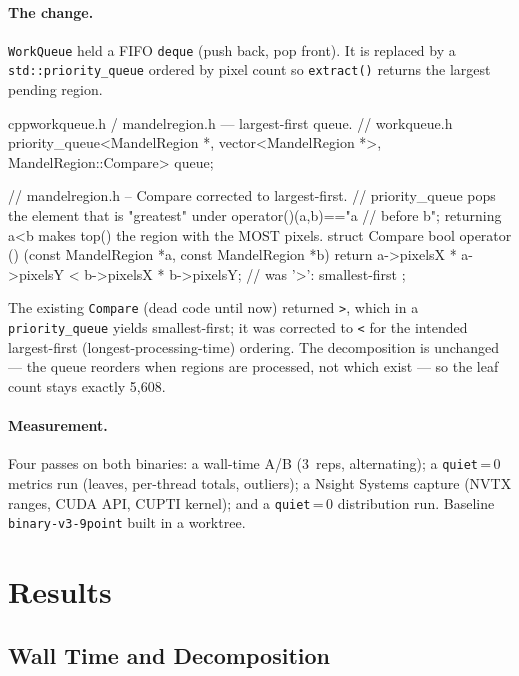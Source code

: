 \documentclass[
	english,
	letterpaper, oneside
]{article}
\begin{document}
\paragraph{The change.} \texttt{WorkQueue} held a FIFO \texttt{deque} (push back,
pop front). It is replaced by a \texttt{std::priority\_queue} ordered by pixel
count so \texttt{extract()} returns the largest pending region.

\begin{sourcecode}{cpp}{workqueue.h / mandelregion.h --- largest-first queue.}
// workqueue.h
priority_queue<MandelRegion *, vector<MandelRegion *>, MandelRegion::Compare> queue;

// mandelregion.h -- Compare corrected to largest-first.
// priority_queue pops the element that is "greatest" under operator()(a,b)=="a
// before b"; returning a<b makes top() the region with the MOST pixels.
struct Compare {
  bool operator () (const MandelRegion *a, const MandelRegion *b) {
    return a->pixelsX * a->pixelsY < b->pixelsX * b->pixelsY;   // was '>': smallest-first
  }
};
\end{sourcecode}

The existing \texttt{Compare} (dead code until now) returned \texttt{>}, which in
a \texttt{priority\_queue} yields smallest-first; it was corrected to
\texttt{<} for the intended largest-first (longest-processing-time) ordering.
The decomposition is unchanged --- the queue reorders when regions are
processed, not which exist --- so the leaf count stays exactly 5{,}608.

\paragraph{Measurement.} Four passes on both binaries: a wall-time A/B
(3~reps, alternating); a \texttt{quiet}\,=\,0 metrics run (leaves, per-thread
totals, outliers); a Nsight Systems capture (NVTX ranges, CUDA API, CUPTI
kernel); and a \texttt{quiet}\,=\,0 distribution run. Baseline \texttt{binary-v3-9point}
built in a worktree.

\section{Results}

\subsection{Wall Time and Decomposition}
\end{document}
